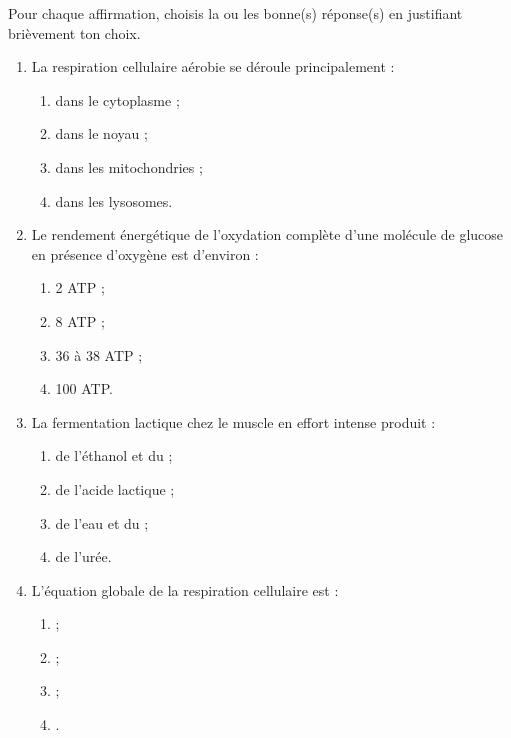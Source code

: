 \documentclass[11pt]{article}
\begin{document}
\begin{exercice}
Pour chaque affirmation, choisis la ou les bonne(s) réponse(s) en justifiant brièvement ton choix.
\begin{enumerate}
\item La respiration cellulaire aérobie se déroule principalement :
\begin{enumerate}
\item dans le cytoplasme ; \item dans le noyau ; \item dans les mitochondries ; \item dans les lysosomes.
\end{enumerate}
\item Le rendement énergétique de l'oxydation complète d'une molécule de glucose en présence d'oxygène est d'environ :
\begin{enumerate}
\item 2 ATP ; \item 8 ATP ; \item 36 à 38 ATP ; \item 100 ATP.
\end{enumerate}
\item La fermentation lactique chez le muscle en effort intense produit :
\begin{enumerate}
\item de l'éthanol et du  ; \item de l'acide lactique ; \item de l'eau et du  ; \item de l'urée.
\end{enumerate}
\item L'équation globale de la respiration cellulaire est :
\begin{enumerate}
\item {} ; \item {} ;
\item {} ; \item {}.
\end{enumerate}
\end{enumerate}
\end{exercice}
\end{document}
